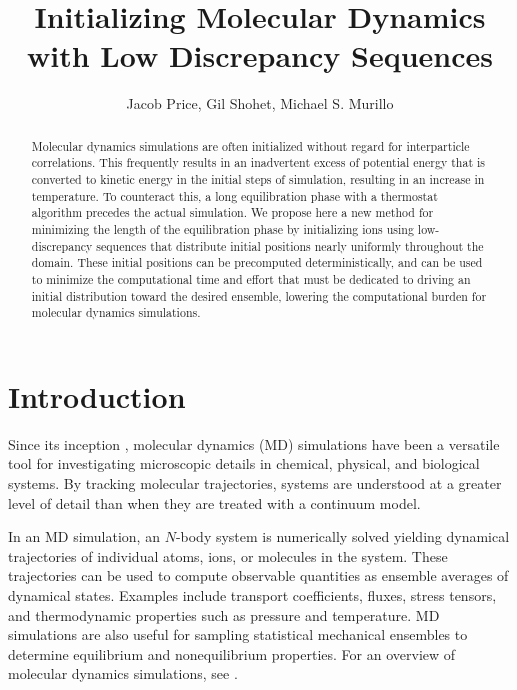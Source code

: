 \documentclass{article}
\title{Initializing Molecular Dynamics with Low Discrepancy Sequences}
\author{Jacob Price, Gil Shohet, Michael S. Murillo}
\begin{document}
\maketitle

\begin{abstract}
Molecular dynamics simulations are often initialized without regard for interparticle correlations. This frequently results in an inadvertent excess of potential energy that is converted to kinetic energy in the initial steps of simulation, resulting in an increase in temperature. To counteract this, a long equilibration phase with a thermostat algorithm precedes the actual simulation. We propose here a new method for minimizing the length of the equilibration phase by initializing ions using low-discrepancy sequences that distribute initial positions nearly uniformly throughout the domain. These initial positions can be precomputed deterministically, and can be used to minimize the computational time and effort that must be dedicated to driving an initial distribution toward the desired ensemble, lowering the computational burden for molecular dynamics simulations.
\end{abstract}

\pagebreak

\section{Introduction}

Since its inception \cite{fermi1955studies}, molecular dynamics (MD) simulations have been a versatile tool for investigating microscopic details in chemical, physical, and biological systems. By tracking molecular trajectories, systems are understood at a greater level of detail than when they are treated with a continuum model.

In an MD simulation, an $N$-body system is numerically solved yielding dynamical trajectories of individual atoms, ions, or molecules in the system. These trajectories can be used to compute observable quantities as ensemble averages of dynamical states. Examples include transport coefficients, fluxes, stress tensors, and thermodynamic properties such as pressure and temperature. MD simulations are also useful for sampling statistical mechanical ensembles to determine equilibrium and nonequilibrium properties. For an overview of molecular dynamics simulations, see \cite{tuckerman2000understanding}.
\end{document}
